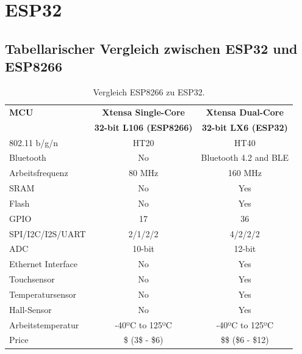 \section{ESP32}\label{Appendix:ESP_32}

\subsection{Tabellarischer Vergleich zwischen ESP32 und ESP8266}\label{Appendix:ESP32_vs_ESP8266}

\begin{table}[H]
\center
\begin{tabular}{|l|c|c|}
\hline
\textbf{MCU}                    & \textbf{Xtensa Single-Core} & \textbf{Xtensa Dual-Core} \\

			                   & \textbf{32-bit L106 (ESP8266)} & \textbf{32-bit LX6 (ESP32)} \\ \hline

802.11 b/g/n     		& HT20                           & HT40                                       \\
Bluetooth              	& No                             & Bluetooth 4.2 and BLE                      \\
Arbeitsfrequenz			& 80 MHz                         & 160 MHz                                    \\
SRAM                   	& No                             & Yes                                         \\
Flash                  	& No                             & Yes                                          \\
GPIO                   	& 17                             & 36                                         \\
SPI/I2C/I2S/UART       	& 2/1/2/2                        & 4/2/2/2                                    \\
ADC                    	& 10-bit                         & 12-bit                                     \\
Ethernet Interface 		& No                             & Yes                                          \\
Touchsensor           	& No                             & Yes                                          \\
Temperatursensor     	& No                             & Yes                                          \\
Hall-Sensor     			& No                             & Yes \\
Arbeitstemperatur    	& -40ºC to 125ºC                 & -40ºC to 125ºC                             \\
Price                  	& \$ (3\$ - \$6)                 & \$\$ (\$6 - \$12)    \\                         
\hline
\end{tabular}
\caption{Vergleich ESP8266 zu ESP32.}
\label{tab:ESP}
\end{table}


